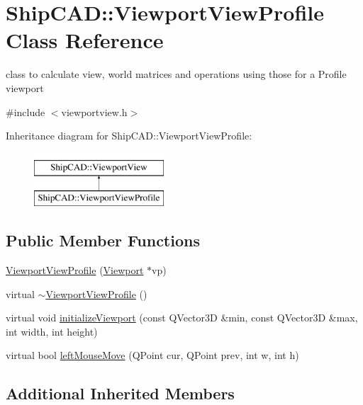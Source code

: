 \hypertarget{classShipCAD_1_1ViewportViewProfile}{\section{Ship\-C\-A\-D\-:\-:Viewport\-View\-Profile Class Reference}
\label{classShipCAD_1_1ViewportViewProfile}
}


class to calculate view, world matrices and operations using those for a Profile viewport  




{\ttfamily \#include $<$viewportview.\-h$>$}

Inheritance diagram for Ship\-C\-A\-D\-:\-:Viewport\-View\-Profile\-:\begin{figure}[H]
\begin{center}
\leavevmode
\includegraphics[height=2.000000cm]{classShipCAD_1_1ViewportViewProfile}
\end{center}
\end{figure}
\subsection*{Public Member Functions}
\begin{DoxyCompactItemize}
\item 
\hyperlink{classShipCAD_1_1ViewportViewProfile_aff06a8bee0af9b969e4dc7373871700e}{Viewport\-View\-Profile} (\hyperlink{classShipCAD_1_1Viewport}{Viewport} $\ast$vp)
\item 
virtual \hyperlink{classShipCAD_1_1ViewportViewProfile_a1c3101fa8a458cf3908cd865349ace08}{$\sim$\-Viewport\-View\-Profile} ()
\item 
virtual void \hyperlink{classShipCAD_1_1ViewportViewProfile_ae8ac602b7c67fddbfce7ceeda85676b3}{initialize\-Viewport} (const Q\-Vector3\-D \&min, const Q\-Vector3\-D \&max, int width, int height)
\item 
virtual bool \hyperlink{classShipCAD_1_1ViewportViewProfile_aa31c0ed3151f473b68197f20b5475cfc}{left\-Mouse\-Move} (Q\-Point cur, Q\-Point prev, int w, int h)
\end{DoxyCompactItemize}
\subsection*{Additional Inherited Members}



